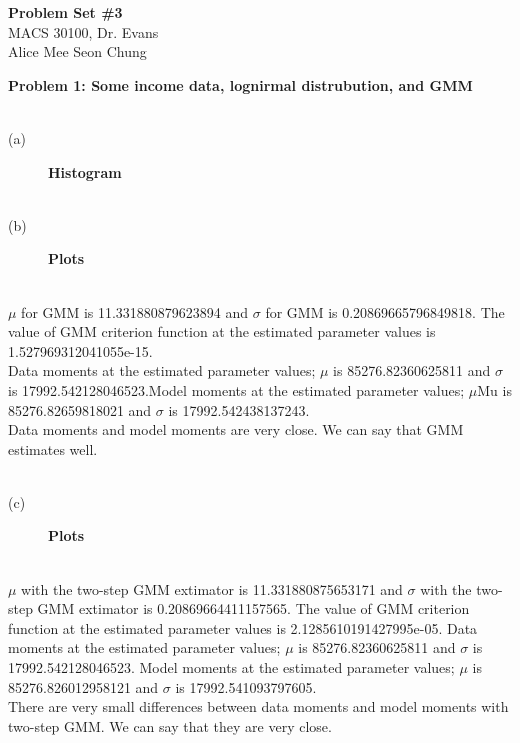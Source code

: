 \documentclass[letterpaper,12pt]{article}
\theoremstyle{definition}
\begin{document}
\begin{flushleft}
  \textbf{\large{Problem Set \#3}} \\
  MACS 30100, Dr. Evans \\
  Alice Mee Seon Chung
\end{flushleft}

\vspace{5mm}

\noindent\textbf{Problem 1: Some income data, lognirmal distrubution, and GMM}
 
 \textbf \\ {(a)} 
 
\begin{figure}[H]\centering\captionsetup{width=5.0in}
  \caption{\textbf{Histogram }}\label{Fig_1}
 \end{figure}
  \newpage
  
 \textbf \\ {(b)} 
 
\begin{figure}[H]\centering\captionsetup{width=5.0in}
  \caption{\textbf{Plots}}\label{Fig_1}
 \end{figure}
 
\noindent\\
$\mu$ for GMM is 11.331880879623894 and $\sigma$ for GMM is 0.20869665796849818. The value of GMM criterion function at the estimated parameter values is 1.527969312041055e-15.\\
Data moments at the estimated parameter values; $\mu$ is 85276.82360625811 and $\sigma$ is 17992.542128046523.Model moments at the estimated parameter values; $\mu$Mu is 85276.82659818021 and $\sigma$ is 17992.542438137243.\\
Data moments and model moments are very close. We can say that GMM estimates well.
 
 \newpage
 
\textbf \\ {(c)} 
 
\begin{figure}[H]\centering\captionsetup{width=5.0in}
  \caption{\textbf{Plots}}\label{Fig_1}
 \end{figure}

\noindent\\ 
$\mu$ with the two-step GMM extimator is 11.331880875653171 and $\sigma$ with the two-step GMM extimator is 0.20869664411157565. The value of GMM criterion function at the estimated parameter values is 2.1285610191427995e-05.
Data moments at the estimated parameter values; $\mu$ is 85276.82360625811 and $\sigma$ is 17992.542128046523. Model moments at the estimated parameter values; $\mu$ is 85276.826012958121 and $\sigma$ is 17992.541093797605.\\
There are very small differences between data moments and model moments with two-step GMM. We can say that they are very close.
\\
\newpage
\end{document}
